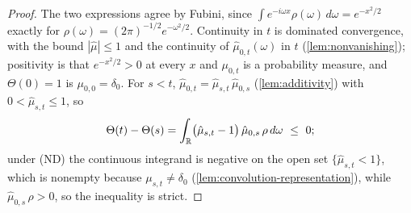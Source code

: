 \begin{proof}
\leanok
The two expressions agree by Fubini, since $\int e^{-i\omega x}\rho(\omega)\,d\omega =
e^{-x^2/2}$ exactly for $\rho(\omega) = (2\pi)^{-1/2}e^{-\omega^2/2}$. Continuity in $t$ is
dominated convergence, with the bound $|\hat\mu| \le 1$ and the continuity of
$\hat\mu_{0,t}(\omega)$ in $t$ (\ref{lem:nonvanishing}); positivity is that $e^{-x^2/2} > 0$ at
every $x$ and $\mu_{0,t}$ is a probability measure, and
$\Theta(0) = 1$ is $\mu_{0,0} = \delta_0$. For $s < t$, $\hat\mu_{0,t} =
\hat\mu_{s,t}\,\hat\mu_{0,s}$ (\ref{lem:additivity}) with $0 < \hat\mu_{s,t} \le 1$, so
\[
  \Theta(t) - \Theta(s)
  = \int_{\mathbb{R}} \bigl(\hat\mu_{s,t} - 1\bigr)\,\hat\mu_{0,s}\,\rho\,d\omega \ \le\ 0 ;
\]
under (ND) the continuous integrand is negative on the open set $\{\hat\mu_{s,t} < 1\}$, which
is nonempty because $\mu_{s,t} \ne \delta_0$ (\ref{lem:convolution-representation}), while
$\hat\mu_{0,s}\,\rho > 0$, so the inequality is strict.
\end{proof}
